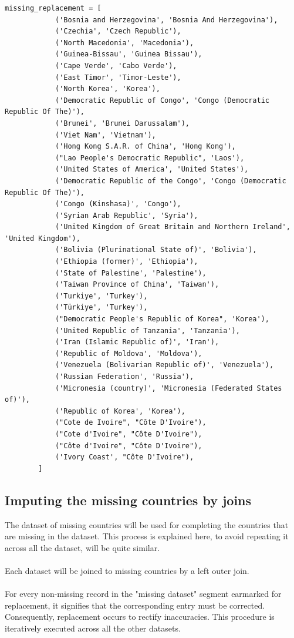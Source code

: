                 \begin{verbatim}
missing_replacement = [
            ('Bosnia and Herzegovina', 'Bosnia And Herzegovina'),
            ('Czechia', 'Czech Republic'),
            ('North Macedonia', 'Macedonia'),
            ('Guinea-Bissau', 'Guinea Bissau'),
            ('Cape Verde', 'Cabo Verde'),
            ('East Timor', 'Timor-Leste'),
            ('North Korea', 'Korea'),
            ('Democratic Republic of Congo', 'Congo (Democratic Republic Of The)'),
            ('Brunei', 'Brunei Darussalam'),
            ('Viet Nam', 'Vietnam'),
            ('Hong Kong S.A.R. of China', 'Hong Kong'),
            ("Lao People's Democratic Republic", 'Laos'),
            ('United States of America', 'United States'),
            ('Democratic Republic of the Congo', 'Congo (Democratic Republic Of The)'),
            ('Congo (Kinshasa)', 'Congo'),
            ('Syrian Arab Republic', 'Syria'),
            ('United Kingdom of Great Britain and Northern Ireland', 'United Kingdom'),
            ('Bolivia (Plurinational State of)', 'Bolivia'),
            ('Ethiopia (former)', 'Ethiopia'),
            ('State of Palestine', 'Palestine'),
            ('Taiwan Province of China', 'Taiwan'),
            ('Turkiye', 'Turkey'),
            ('Türkiye', 'Turkey'),
            ("Democratic People's Republic of Korea", 'Korea'),
            ('United Republic of Tanzania', 'Tanzania'),
            ('Iran (Islamic Republic of)', 'Iran'),
            ('Republic of Moldova', 'Moldova'),
            ('Venezuela (Bolivarian Republic of)', 'Venezuela'),
            ('Russian Federation', 'Russia'),
            ('Micronesia (country)', 'Micronesia (Federated States of)'),
            ('Republic of Korea', 'Korea'),
            ("Cote de Ivoire", "Côte D'Ivoire"),
            ("Cote d'Ivoire", "Côte D'Ivoire"),
            ("Côte d'Ivoire", "Côte D'Ivoire"),
            ('Ivory Coast', "Côte D'Ivoire"),
        ]
                \end{verbatim}

        \subsection{Imputing the missing countries by joins}

            The dataset of missing countries will be used for completing the countries that are missing in the dataset. This process is explained here, to avoid repeating it across all the dataset, will be quite similar.
            \\
            \\
            Each dataset will be joined to missing countries by a left outer join.
            \\
            \\
            For every non-missing record in the "missing dataset" segment earmarked for replacement, it signifies that the corresponding entry must be corrected. Consequently, replacement occurs to rectify inaccuracies. This procedure is iteratively executed across all the other datasets.


